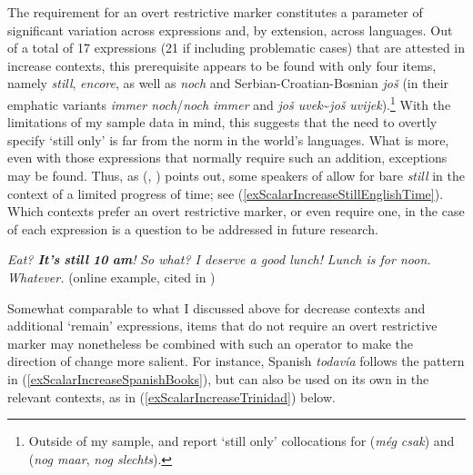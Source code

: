 The requirement for an overt restrictive marker constitutes a parameter of significant variation across expressions and, by extension, across languages. Out of a total of 17 expressions (21 if including problematic cases) that are attested in increase contexts, this prerequisite appears to be found with only four items, namely  \textit{still},  \textit{encore}, as well as  \textit{noch} and Serbian\hyp Croatian\hyp Bosnian \textit{još} (in their emphatic variants \textit{immer noch}/\textit{noch immer} and \textit{još uvek}\sim{}\textit{još} \textit{uvijek}).\footnote{Outside of my sample, \textcite{vanderAuwera1993} and \textcite{Vandeweghe1992} report \lq still only\rq{ }collocations for  (\textit{még csak}) and  (\textit{nog maar}, \textit{nog slechts}).} With the limitations of my sample data in mind, this suggests that the need to overtly specify \lq still only\rq{ }is far from the norm in the world's languages. What is more, even with those expressions that normally require such an addition, exceptions may be found. Thus, as \citeauthor{Ippolito2004} (\citeyear{Ippolito2004}, \citeyear{Ippolito2007}) points out, some speakers of  allow for bare \textit{still} in the context of a limited progress of time; see (\ref{exScalarIncreaseStillEnglishTime}). Which contexts prefer an overt restrictive marker, or even require one, in the case of each expression is a question to be addressed in future research.

\begin{exe}
	\ex{}\label{exScalarIncreaseStillEnglishTime}
	\begin{xlist}
		\textit{Eat? \textbf{It's} \textbf{still} \textbf{10} \textbf{am}!}
		 \textit{So what? I deserve a good lunch!}
		 \textit{Lunch is for noon.}
		 \textit{Whatever. }(online example, cited in \cite[2 fn2]{Ippolito2007})
	\end{xlist}
\end{exe}

Somewhat comparable to what I discussed above for decrease contexts and additional \lq{}remain\rq{ }expressions, items that do not require an overt restrictive marker may nonetheless be combined with such an operator to make the direction of change more salient. For instance, Spanish \textit{todavía} follows the  pattern in (\ref{exScalarIncreaseSpanishBooks}), but can also be used on its own in the relevant contexts, as in (\ref{exScalarIncreaseTrinidad}) below.

